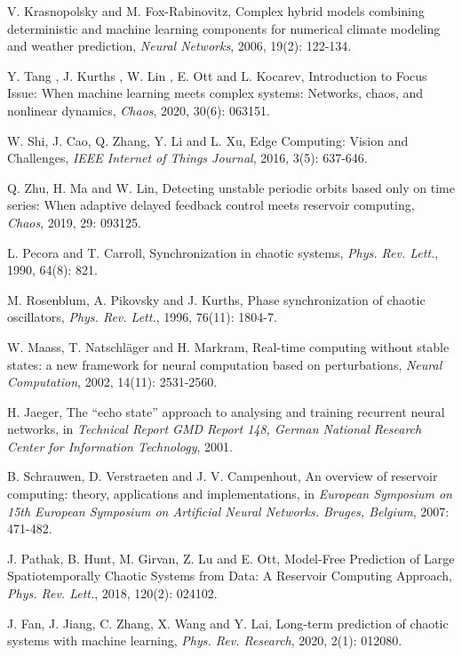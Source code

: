 \documentclass[notitlepage,cs4size,punct,oneside]{ctexrep}
\numberwithin{equation}{chapter}
\theoremstyle{mystyle}
\begin{document}
\begin{thebibliography}{99}
\footnotesize

 V. Krasnopolsky and M. Fox-Rabinovitz, 
Complex hybrid models combining deterministic and machine learning components for numerical climate modeling and weather prediction,
\emph{Neural Networks}, 2006, 19(2): 122-134.

 Y. Tang , J. Kurths , W. Lin , E. Ott and L. Kocarev,
Introduction to Focus Issue: When machine learning meets complex systems: Networks, chaos, and nonlinear dynamics,
\emph{Chaos}, 2020, 30(6): 063151.

 W. Shi, J. Cao, Q. Zhang, Y. Li and L. Xu,
Edge Computing: Vision and Challenges,
\emph{IEEE Internet of Things Journal}, 2016, 3(5): 637-646.

 Q. Zhu, H. Ma and W. Lin,
Detecting unstable periodic orbits based only on time series: When adaptive delayed feedback control meets reservoir computing,
\emph{Chaos}, 2019, 29: 093125.

 L. Pecora and T. Carroll,
Synchronization in chaotic systems, 
\emph{Phys. Rev. Lett.}, 1990, 64(8): 821. 

 M. Rosenblum, A. Pikovsky and J. Kurths,
Phase synchronization of chaotic oscillators, 
\emph{Phys. Rev. Lett.}, 1996, 76(11): 1804-7. 

 W. Maass, T. Natschläger and H. Markram,
Real-time computing without stable states: a new framework for neural computation based on perturbations, 
\emph{Neural Computation}, 2002, 14(11): 2531-2560. 

 H. Jaeger, 
The ``echo state'' approach to analysing and training recurrent neural networks, in
\emph{Technical Report GMD Report 148, German National Research Center for Information Technology}, 
2001.

 B. Schrauwen, D. Verstraeten and J. V. Campenhout, 
An overview of reservoir computing: theory, applications and implementations, in
\emph{European Symposium on 15th European Symposium on Artificial Neural Networks. Bruges, Belgium}, 
2007: 471-482.

 J. Pathak, B. Hunt, M. Girvan, Z. Lu and E. Ott,
Model-Free Prediction of Large Spatiotemporally Chaotic Systems from Data: A Reservoir Computing Approach, 
\emph{Phys. Rev. Lett.}, 2018, 120(2): 024102.

 J. Fan, J. Jiang, C. Zhang, X. Wang and Y. Lai,
Long-term prediction of chaotic systems with machine learning, 
\emph{Phys. Rev. Research}, 2020, 2(1): 012080.



\end{thebibliography}
\end{document}
